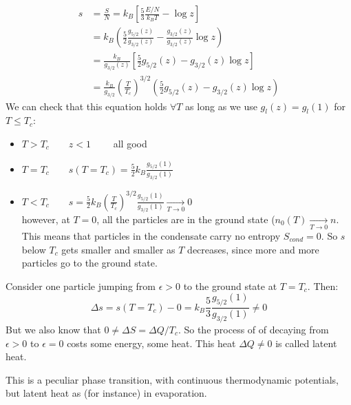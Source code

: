 \begin{itemize}
    \begin{align*}
        s &= \frac SN = k_B\left[\frac53\frac{E/N}{k_BT} - \log z\right]\\
        &= k_B\left(\frac52\frac{g_{5/2}(z)}{g_{3/2}(z)} - \frac{g_{3/2}(z)}{g_{3/2}(z)}\log z\right)\\
        &= \frac {k_B}{g_{3/2}(z)}\left[\frac52g_{5/2}(z) - g_{3/2}(z)\log z\right]\\
        &= \frac{k_B}{g_{3/2}} \left(\frac T{T_c}\right)^{3/2}\left(\frac52g_{5/2}(z) - g_{3/2}(z)\log z\right)
    \end{align*}
    We can check that this equation holds $\forall T$ as long as we use $g_l(z) = g_l(1)$ for $T \le T_c$:
    \begin{itemize}
        \item $T>T_c \qquad z<1\qquad$ all good
        \item $T=T_c \qquad s(T=T_c) = \frac52 k_B\frac{g_{5/2}(1)}{g_{3/2}(1)}$
        \item $T<T_c \qquad s = \frac52 k_B\left(\frac T{T_c}\right)^{3/2}\frac{g_{5/2}(1)}{g_{3/2}(1)} \xrightarrow[T\to 0]{}0$\\
        however, at $T=0$, all the particles are in the ground state ($n_0(T) \xrightarrow[T\to0]{}n$. This means that particles in the condensate carry no entropy $S_{cond} = 0$. So $s$ below $T_c$ gets smaller and smaller as $T$ decreases, since more and more particles go to the ground state.
    \end{itemize}
        
    Consider one particle jumping from $\epsilon > 0$ to the ground state at $T=T_c$. Then:
    $$ \Delta s = s(T=T_c) - 0 = k_B\frac 53 \frac{g_{5/2}(1)}{g_{3/2}(1)} \ne 0$$
    But we also know that $0 \ne \Delta S = \Delta Q / T_c$. So the process of of decaying from $\epsilon > 0$ to $\epsilon =0$ costs some energy, some heat. This heat $\Delta Q \ne 0$ is called latent heat.

    This is a peculiar phase transition, with continuous thermodynamic potentials, but latent heat as (for instance) in evaporation.

\end{itemize}

